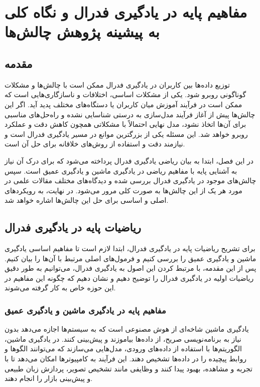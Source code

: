 \chapter{مفاهیم پایه در یادگیری فدرال و نگاه کلی به پیشینه پژوهش چالش‌ها}

\section{مقدمه}
توزیع داده‌ها بین کاربران در یادگیری فدرال ممکن است با چالش‌ها و مشکلات گوناگونی روبرو شود. یکی از مشکلات اساسی، اختلافات و ناسازگاری‌هایی است که ممکن است در فرآیند آموزش میان کاربران یا دستگاه‌های مختلف پدید آید. اگر این چالش‌ها پیش از آغاز فرآیند مدل‌سازی به درستی شناسایی نشده و راه‌حل‌های مناسبی برای آن‌ها اتخاذ نشود، مدل نهایی احتمالاً با مشکلاتی همچون کاهش دقت و عملکرد روبرو خواهد شد. این مسئله یکی از بزرگترین موانع در مسیر یادگیری فدرال است و نیازمند دقت و استفاده از روش‌های خلاقانه برای حل آن است.

در این فصل، ابتدا به بیان ریاضی یادگیری فدرال پرداخته می‌شود که برای درک آن نیاز به آشنایی پایه با مفاهیم ریاضی در یادگیری ماشین و یادگیری عمیق است. سپس چالش‌های موجود در یادگیری فدرال بررسی شده و دیدگاه‌های مختلف مقالات علمی در مورد هر یک از این چالش‌ها به صورت کلی مرور می‌شود. در نهایت، به رویکردهای اصلی و اساسی برای حل این چالش‌ها اشاره خواهد شد.


\section{ریاضیات پایه در یادگیری فدرال}
برای تشریح ریاضیات پایه در یادگیری فدرال، ابتدا لازم است تا مفاهیم اساسی یادگیری ماشین و یادگیری عمیق را بررسی کنیم و فرمول‌های اصلی مرتبط با آن‌ها را بیان کنیم. پس از این مقدمه، با مرتبط کردن این اصول به یادگیری فدرال، می‌توانیم به طور دقیق ریاضیات اولیه در یادگیری فدرال را توضیح دهیم و نشان دهیم که چگونه این مفاهیم در این حوزه خاص به کار گرفته می‌شوند.

\subsection{مفاهیم پایه در یادگیری ماشین و یادگیری عمیق}
یادگیری ماشین شاخه‌ای از هوش مصنوعی است که به سیستم‌ها اجازه می‌دهد بدون نیاز به برنامه‌نویسی صریح، از داده‌ها بیاموزند و پیش‌بینی کنند. در یادگیری ماشین، الگوریتم‌ها با استفاده از داده‌های ورودی، مدل‌هایی می‌سازند که می‌توانند الگوها و روابط پیچیده را در داده‌ها تشخیص دهند. این فرآیند به کامپیوترها امکان می‌دهد تا با تجربه و مشاهده، بهبود پیدا کنند و وظایفی مانند تشخیص تصویر، پردازش زبان طبیعی و پیش‌بینی بازار را انجام دهند.

